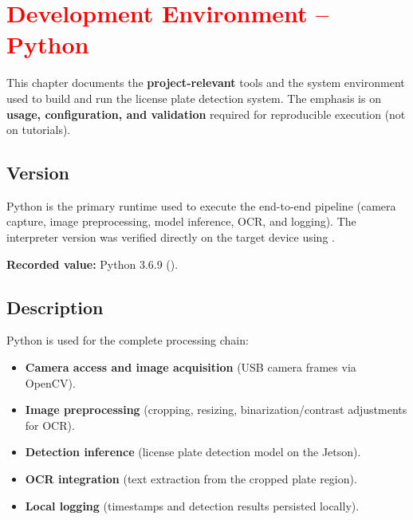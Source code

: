 %
%
%

\chapter{\textcolor{red}{Development Environment -- Python}}

\providecommand{\TBD}[1]{\textcolor{red}{#1}}

\noindent
This chapter documents the \textbf{project-relevant} tools and the system environment used to build and run the license plate detection system.
The emphasis is on \textbf{usage, configuration, and validation} required for reproducible execution (not on tutorials).

\section{Version}
\noindent
Python is the primary runtime used to execute the end-to-end pipeline (camera capture, image preprocessing, model inference, OCR, and logging).
The interpreter version was verified directly on the target device using .

\vspace{1mm}
\noindent
\textbf{Recorded value:} Python 3.6.9 ().

\section{Description}
\noindent
Python is used for the complete processing chain:
\begin{itemize}
	\item \textbf{Camera access and image acquisition} (USB camera frames via OpenCV).
	\item \textbf{Image preprocessing} (cropping, resizing, binarization/contrast adjustments for OCR).
	\item \textbf{Detection inference} (license plate detection model on the Jetson).
	\item \textbf{OCR integration} (text extraction from the cropped plate region).
	\item \textbf{Local logging} (timestamps and detection results persisted locally).
\end{itemize}

